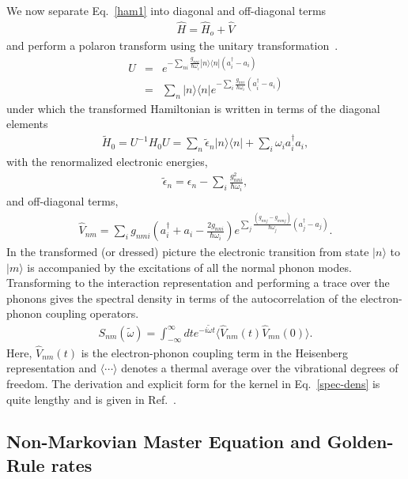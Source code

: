 We now separate Eq.~\ref{ham1} into diagonal and
off-diagonal terms
\begin{eqnarray}
\hat  H = \hat H_{o} + \hat V
\end{eqnarray}
and perform a polaron transform
using the unitary transformation~\cite{grover1970exciton,rice1994excitons,pereverzev2006time}.
\begin{eqnarray}
U&=&e^{-\sum_{ni}\!\!\frac{g_{nni}}{\hbar\omega_i}|n\rangle \langle
n|(a^{\dagger}_i-a_i)}
 \nonumber \\
&=&
\sum_{n}|n\rangle \langle n|e^{-\sum_{i}\!\!\frac{g_{nni}}{\hbar\omega_i}(a^{\dagger}_i-a_i)}
\label{unitary}
\end{eqnarray}
under which the transformed Hamiltonian is written in terms of the
diagonal elements
\begin{eqnarray} \tilde H_0=U^{-1}H_0U
=\sum_n\tilde\epsilon_n |n\rangle \langle
n|+\sum_i\omega_ia^{\dagger}_ia_i,
 \end{eqnarray}
with  the renormalized electronic energies,
\begin{eqnarray}
\tilde\epsilon_n=\epsilon_n-\sum_{i}\frac{g_{nni}^2}{\hbar\omega_i},
\end{eqnarray}
and off-diagonal terms,
\begin{eqnarray} \hat V_{nm}=\sum_{i}g_{nmi}\left(a^{\dagger}_i+
a_i-\frac{2g_{nni}}{\hbar\omega_i}\right)e^{\sum_{j}\frac{(g_{nnj}-g_{mmj})}{\hbar\omega_j}(a^{\dagger}_j-a_j)}.
\label{opm}
\end{eqnarray}
In the transformed (or dressed) picture the electronic transition from state
$|n\rangle$ to $|m\rangle$ is accompanied by the excitations of all the
normal phonon modes.  Transforming to the interaction representation
and performing a trace over the phonons gives the spectral density in
terms of the autocorrelation of the electron-phonon coupling
operators.
\begin{eqnarray}
S_{nm}(\tilde\omega) = \int_{-\infty}^{\infty} dt e^{-i\tilde \omega t}\langle \hat V_{nm}(t) \hat V_{mn}(0)\rangle.\label{spec-dens}
\end{eqnarray}
Here, $\hat V_{nm}(t)$ is the electron-phonon coupling term in the Heisenberg representation and
$\langle \cdots \rangle$ denotes a thermal average over the
vibrational degrees of freedom.
The derivation and explicit form for the kernel in Eq.~\ref{spec-dens}  is quite lengthy and is given in
Ref.~\cite{pereverzev2006time}.

\subsection{Non-Markovian Master Equation and Golden-Rule rates}

